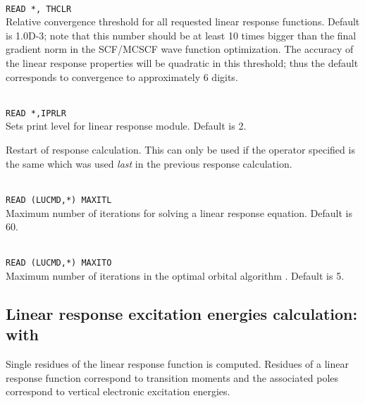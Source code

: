 \begin{description}
\item{}\\
\verb|READ *, THCLR|\\
Relative convergence threshold for all requested linear response functions.
Default is 1.0D-3; note that this number should be at least 10 times
bigger than the final gradient norm in the SCF/MCSCF
wave function optimization. The accuracy of the linear response 
properties will be quadratic in this threshold; thus the default
corresponds to convergence to approximately 6 digits.

\item{}\\
\verb|READ *,IPRLR|\\
Sets print level for linear response module. Default is 2.
 
\item{}
Restart of response calculation. This
can only be used if the  
operator specified is the same which was used \textit{last} in the previous
response calculation.

\item{}\\
\verb|READ (LUCMD,*) MAXITL|\\
Maximum number of iterations for solving a linear response 
equation. Default is 60.

\item{}\\
\verb|READ (LUCMD,*) MAXITO|\\
Maximum number of iterations in the optimal orbital
algorithm
\cite{tuhjahjajpjjcp84}. 
Default is 5.


\end{description}

\subsection{Linear response excitation energies calculation:  with }

Single residues of the linear
response function is
computed. Residues of a linear response function correspond to
transition moments and the associated poles
correspond to vertical electronic excitation energies.

